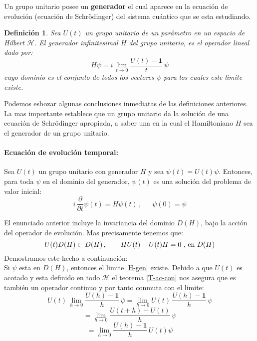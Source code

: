 \documentclass[12pt]{book}
\numberwithin{equation}{chapter}
\newtheorem{definition}[theorem]{Definici\'on}
\def\rar{\rightarrow}
\def\H{\mathcal{H}}
\def\1{\mathbf{1}}
\begin{document}
Un grupo unitario posee un {\bf generador} el cual aparece en la ecuaci\'on de evoluci\'on (ecuaci\'on de Schr\"odinger) del sistema cu\'antico que se esta estudiando. 

\begin{definition}
Sea $U(t)$ un grupo unitario de un par\'ametro en un espacio de Hilbert $\H$. El 
generador infinitesimal $H$ del grupo unitario, es el operador lineal dado por:
\begin{equation}\label{H-gen}
H \psi = i \, \lim_{t \rar 0} \frac{ U(t) - \1 }{t}\, \psi 
\end{equation}
cuyo dominio es el conjunto de todos los vectores $\psi$ para los cuales este limite existe.
\end{definition}

Podemos esbozar algunas conclusiones inmediatas de las definiciones anteriores. La mas importante establece que un grupo unitario da la soluci\'on de una ecuaci\'on de Schr\"odinger apropiada, a saber una en la cual el Hamiltoniano $H$ sea el generador de un grupo unitario.

\paragraph{Ecuaci\'on de evoluci\'on temporal: } Sea $U(t)$ un grupo unitario con generador $H$ y sea $\psi (t) = U(t) \psi $. Entonces, para toda $\psi$ en el dominio del generador, $\psi (t)$ es una soluci\'on del problema de valor inicial:
\begin{equation}\label{ec-sch}
i \, \frac{\partial}{\partial t} \psi (t)= H \psi (t)\,, \,\,\,\,\,\,\,\,\, \psi (0)= \psi
\end{equation}
\rightline{$\dag$}
\vspace{3 mm} 

El enunciado anterior incluye la invariancia del dominio $D(H)$, bajo la acci\'on del operador de evoluci\'on. Mas precisamente tenemos que:
$$ U(t) D(H) \subset D(H)\,,\,\,\,\,\,\,\,\,\,\,\,\, HU(t) - U(t)H=0 \hbox{ , en } D(H) $$
Demostramos este hecho a continuaci\'on:\\

Si $\psi$ esta en $D(H)$, entonces el limite \eqref{H-gen} existe. Debido a que $U(t)$ es acotado y esta definido en todo $\H$ el teorema \ref{T-ac-con} nos asegura que es tambi\'en un operador continuo y por tanto conmuta con el limite:
\begin{equation}
U(t)\, \lim_{h \rar 0} \frac{U(h) - \1}{h}\, \psi = \lim_{h \rar 0} U(t)\, \frac{U(h) - \1}{h}\, \psi 
\end{equation}
\begin{equation}\label{g-prop}
= \lim_{h \rar 0} \frac{U(t+h) - U(t)}{h}\, \psi 
\end{equation}
\begin{equation}\label{g-prop2}
= \lim_{h \rar 0} \frac{U(h) - \1}{h}\, U(t)\psi
\end{equation}
\end{document}
